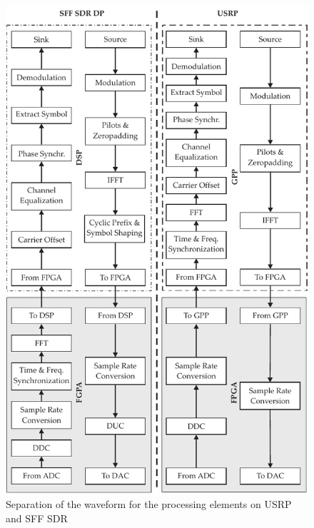 \begin{figure}[htb]
	\centering
		\includegraphics[height=0.9\textheight]{../kapitel05/figures/OFDM_b.pdf}
	\caption{Separation of the waveform for the processing elements on USRP and SFF SDR}
	\label{fig:OFDM_b}
\end{figure}

